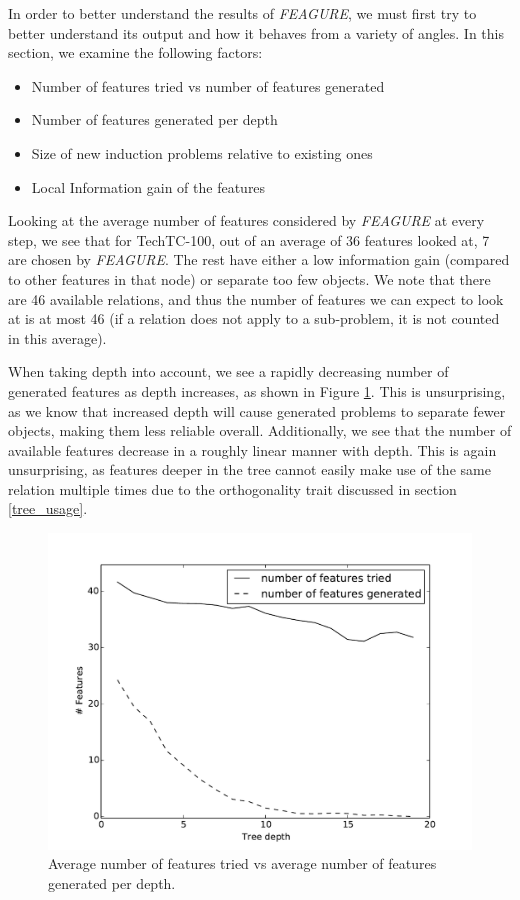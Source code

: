 \documentclass[twoside,11pt]{article}
\theoremstyle{definition}
\begin{document}
In order to better understand the results of \emph{FEAGURE}, we must first try to better understand its output and how it behaves from a variety of angles.
In this section, we examine the following factors:
\begin{itemize}
	\item Number of features tried vs number of features generated
	\item Number of features generated per depth
	\item Size of new induction problems relative to existing ones
	\item Local Information gain of the features
\end{itemize}

Looking at the average number of features considered by \emph{FEAGURE} at every step, we see that for TechTC-100, out of an average of 36 features looked at, 7 are chosen by \emph{FEAGURE}. The rest have either a low information gain (compared to other features in that node) or separate too few objects.
We note that there are 46 available relations, and thus the number of features we can expect to look at is at most 46 (if a relation does not apply to a sub-problem, it is not counted in this average). 

When taking depth into account, we see a rapidly decreasing number of generated features as depth increases, as shown in Figure \ref{fig:features_per_depth}.
This is unsurprising, as we know that increased depth will cause generated problems to separate fewer objects, making them less reliable overall. Additionally, we see that the number of available features decrease in a roughly linear manner with depth. This is again unsurprising, as features deeper in the tree cannot easily make use of the same relation multiple times due to the orthogonality trait discussed in section \ref{tree_usage}.

\begin{figure}[h!]
	\centering
	\includegraphics[scale=0.4]{features_per_depth}
	\caption{Average number of features tried vs average number of features generated per depth.}
	\label{fig:features_per_depth}
\end{figure}
\end{document}
